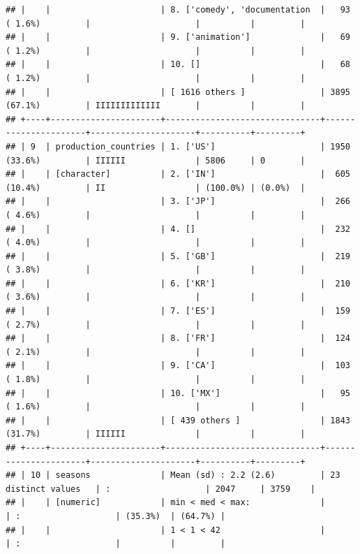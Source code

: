 \documentclass[11pt,preprint]{elsarticle}
\numberwithin{equation}{section}
\numberwithin{figure}{section}
\numberwithin{table}{section}
\begin{document}
\begin{verbatim}
## |    |                      | 8. ['comedy', 'documentation  |   93 ( 1.6%)         |                     |          |         |
## |    |                      | 9. ['animation']              |   69 ( 1.2%)         |                     |          |         |
## |    |                      | 10. []                        |   68 ( 1.2%)         |                     |          |         |
## |    |                      | [ 1616 others ]               | 3895 (67.1%)         | IIIIIIIIIIIII       |          |         |
## +----+----------------------+-------------------------------+----------------------+---------------------+----------+---------+
## | 9  | production_countries | 1. ['US']                     | 1950 (33.6%)         | IIIIII              | 5806     | 0       |
## |    | [character]          | 2. ['IN']                     |  605 (10.4%)         | II                  | (100.0%) | (0.0%)  |
## |    |                      | 3. ['JP']                     |  266 ( 4.6%)         |                     |          |         |
## |    |                      | 4. []                         |  232 ( 4.0%)         |                     |          |         |
## |    |                      | 5. ['GB']                     |  219 ( 3.8%)         |                     |          |         |
## |    |                      | 6. ['KR']                     |  210 ( 3.6%)         |                     |          |         |
## |    |                      | 7. ['ES']                     |  159 ( 2.7%)         |                     |          |         |
## |    |                      | 8. ['FR']                     |  124 ( 2.1%)         |                     |          |         |
## |    |                      | 9. ['CA']                     |  103 ( 1.8%)         |                     |          |         |
## |    |                      | 10. ['MX']                    |   95 ( 1.6%)         |                     |          |         |
## |    |                      | [ 439 others ]                | 1843 (31.7%)         | IIIIII              |          |         |
## +----+----------------------+-------------------------------+----------------------+---------------------+----------+---------+
## | 10 | seasons              | Mean (sd) : 2.2 (2.6)         | 23 distinct values   | :                   | 2047     | 3759    |
## |    | [numeric]            | min < med < max:              |                      | :                   | (35.3%)  | (64.7%) |
## |    |                      | 1 < 1 < 42                    |                      | :                   |          |         |

\end{verbatim}
\end{document}
